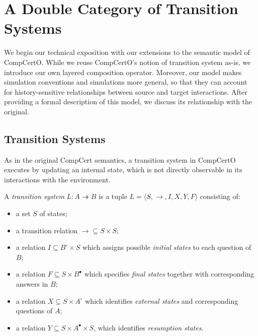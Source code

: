 \documentclass[acmsmall,screen,review,anonymous]{acmart}
\newcommand{\que}{\circ}
\newcommand{\ans}{\bullet}
\begin{document}

\section{A Double Category of Transition Systems} \label{sec:base} %


We begin our technical exposition with
our extensions to the semantic model of CompCertO.
While we reuse CompCertO's notion of transition system as-is,
we introduce our own layered composition operator.
Moreover,
our model makes simulation conventions and simulations
more general, so that they can account for
history-sensitive relationships
between source and target interactions.
After providing a formal description of this model,
we discuss its relationship with the original.


\subsection{Transition Systems} \label{sec:base:ts} %

As in the original CompCert semantics,
a transition system in CompCertO
executes by updating an internal state,
which is not directly observable
in its interactions with the environment.

\begin{definition} \label{def:lts} %
A \emph{transition system} $L : A \twoheadrightarrow B$
is a tuple $L = \langle S, {\rightarrow}, I, X, Y, F \rangle$
consisting of:
\begin{itemize}
  \item a set $S$ of states;
  \item a transition relation ${\rightarrow} \subseteq S \times S$;
  \item a relation $I \subseteq B^\que \times S$
    which assigns possible \emph{initial states}
    to each question of $B$;
  \item a relation $F \subseteq S \times B^\ans$
    which specifies \emph{final states} together with
    corresponding answers in $B$;
  \item a relation $X \subseteq S \times A^\que$
    which identifies \emph{external states} and
    corresponding questions of $A$;
  \item a relation $Y \subseteq S \times A^\ans \times S$,
    which identifies \emph{resumption states}.
\end{itemize}
\end{definition}
\end{document}

